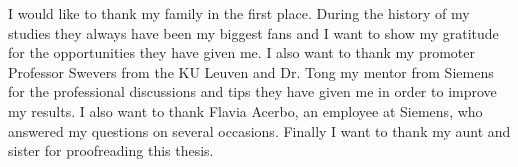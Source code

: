 \documentclass[master=elt,masteroption=eg,english]{kulemt}
\begin{document}

\begin{preface}
	I would like to thank my family in the first place. During the history of my studies they always have been my biggest fans and I want to show my gratitude for the opportunities they have given me. I also want to thank my promoter Professor Swevers from the KU Leuven and Dr. Tong my mentor from Siemens for the professional discussions and tips they have given me in order to improve my results. I also want to thank Flavia Acerbo, an employee at Siemens, who answered my questions on several occasions. Finally I want to thank my aunt and sister for proofreading this thesis.

\end{preface}

\tableofcontents*
\end{document}
